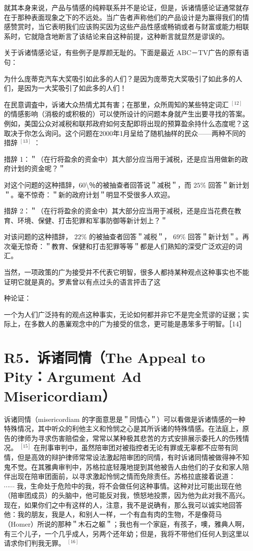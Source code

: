 就其本身来说，产品与情感的纯粹联系并不是论证，但是，诉诸情感论证通常就存在于那种表面现象之下的不远处。当广告者声称他们的产品设计是为赢得我们的情感赞赏时，当它表明我们应该购买因为这些产品性感或畅销或者与财富或能力相联系时，它就隐含地断言了该结论来自这种前提，这种断言就显然是谬误的。

关于诉诸情感论证，有些例子是厚颜无耻的。下面是最近 ABC－TV广告的原有语句：

为什么庞蒂克汽车大奖吸引如此多的人们？是因为庞蒂克大奖吸引了如此多的人们，是因为一大奖吸引了如此多的人们！

在民意调査中，诉诸大众热情尤其有害；在那里，众所周知的某些特定词汇 ${ }^{[12]}$ 的情感影响（消极的或积极的）可以使所设计的问题本身就产生出要寻找的答案。例如，美国公众对减税和联邦政府如何支配即将出现的预算盈余持什么态度呢？这取决于你怎么询问。这个问题在2000年1月呈给了随机抽样的民众——两种不同的措辞 ${ }^{[13]}$ ：

措辞 1：＂（在行将盈余的资金中）其大部分应当用于減税，还是应当用做新的政府计划的资金呢？＂

对这个问题的这种措辞，60\textbackslash ％的被抽查者回答说＂减税＂，而 $25 \%$ 回答＂新计划＂。毫不惊奇：＂新的政府计划＂明显不受很多人欢迎。

措辞 2：＂（在行将盈余的资金中）其大部分应当用于减税，还是应当花费在教育、环境、保健、打击犯罪和军事防御等新计划上？＂

对该问题的这种措辞， $22 \%$ 的被抽查者回答＂减税＂， $69 \%$ 回答＂新计划＂。再次毫无惊奇：＂教育、保健和打击犯罪等等＂都是人们熟知的深受广泛欢迎的词汇。

当然，一项政策的广为接受并不代表它明智，很多人都持某种观点这种事实也不能证明它就是真的。罗素曾以有点过头的语言抨击了这

种论证：

一个为人们广泛持有的观点这种事实，无论如何都并非它不是完全荒谬的证据；实际上，在多数人的愚嶪观念中的广为接受的信念，更可能是愚笨多于明智。［14］

\section*{R5．诉诸同情（The Appeal to Pity：Argument Ad Misericordiam）}
诉诸同情（misericordiam 的字面意思是＂同情心＂）可以看做是诉诸情感的一种特殊情况，其中听众的利他主义和怜悯之心是其所诉诸的特殊情感。在法庭上，原告的律师为寻求伤害赔偿金，常常以某种极其悲苦的方式安排展示委托人的伤残情况。 ${ }^{[15]}$ 在刑事审判中，虽然陪审团对被指控者无论有罪或无辜都不应带有同情，但是高效的辩护律师常常设法激起陪审团的同情，有时诉诸同情被做得神不知鬼不觉。在其雅典审判中，苏格拉底轻蔑地提到其他被告人由他们的子女和家人陪伴出现在陪审团面前，以寻求激起怜悯之情而免除责任。苏格拉底接着说道：\\
$\cdots \cdots$ 我，生命处于危险中的我，将不会做任何这种事情。这种对比可能出现在他（陪审团成员）的头脑中，他可能反对我，愤怒地投票，因为他为此对我不高兴。现在，如果你们之中有这样的人，注意，我不是说确有，那么我可以诚实地回答他：我的朋友，我是人，和别人一样，一个有血有肉的生物，不是像荷马 （Homer）所说的那种＂木石之躯＂；我也有一个家庭，有孩子，噢，雅典人啊，有三个儿子，一个几乎成人，另两个还年幼；但是，我将不带他们任何人到这里以请求你们判我无罪。 ${ }^{[16]}$

